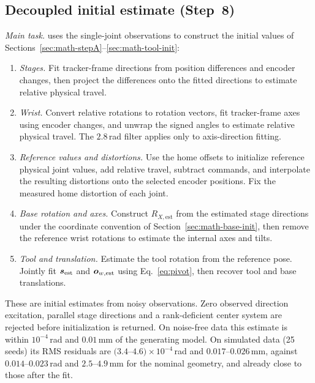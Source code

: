 \documentclass[../main.tex]{subfiles}
\begin{document}
\subsection{Decoupled initial estimate (Step~8)}\label{sec:alg-init}
\noindent\textit{Main task.}  uses the single-joint observations to construct the initial values of Sections~\ref{sec:math-stepA}--\ref{sec:math-tool-init}:
\begin{enumerate}
\renewcommand{\labelenumi}{\roman{enumi}.}
\item \textit{Stages.} Fit tracker-frame directions from position differences and encoder changes, then project the differences onto the fitted directions to estimate relative physical travel.
\item \textit{Wrist.} Convert relative rotations to rotation vectors, fit tracker-frame axes using encoder changes, and unwrap the signed angles to estimate relative physical travel. The $2.8$\,rad filter applies only to axis-direction fitting.
\item \textit{Reference values and distortions.} Use the home offsets to initialize reference physical joint values, add relative travel, subtract commands, and interpolate the resulting distortions onto the selected encoder positions. Fix the measured home distortion of each joint.
\item \textit{Base rotation and axes.} Construct $R_{X,\mathrm{est}}$ from the estimated stage directions under the coordinate convention of Section~\ref{sec:math-base-init}, then remove the reference wrist rotations to estimate the internal axes and tilts.
\item \textit{Tool and translation.} Estimate the tool rotation from the reference pose. Jointly fit $\bm{s}_{\mathrm{est}}$ and $\bm{o}_{w,\mathrm{est}}$ using Eq.~\eqref{eq:pivot}, then recover tool and base translations.
\end{enumerate}
These are initial estimates from noisy observations. Zero observed direction excitation, parallel stage directions and a rank-deficient center system are rejected before initialization is returned.
On noise-free data this estimate is within $10^{-4}$\,rad and $0.01$\,mm of the generating model. On simulated data (25 seeds) its RMS residuals are $(3.4$--$4.6)\times10^{-4}$\,rad and $0.017$--$0.026$\,mm, against $0.014$--$0.023$\,rad and $2.5$--$4.9$\,mm for the nominal geometry, and already close to those after the fit.
\end{document}
